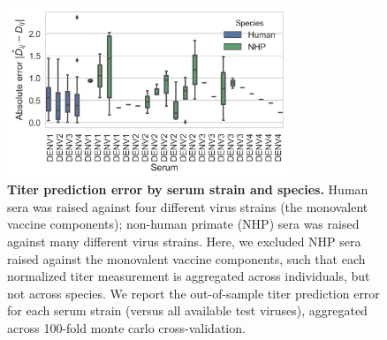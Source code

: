 \documentclass[11pt,oneside,letterpaper]{article}
\begin{document}
\begin{figure}[ht]
\centering
	\includegraphics[width=0.75\textwidth]{../figures/png/titer_species_error.png}
	\caption{\textbf{Titer prediction error by serum strain and species.}
  Human sera was raised against four different virus strains (the monovalent vaccine components); non-human primate (NHP) sera was raised against many different virus strains.
  Here, we excluded NHP sera raised against the monovalent vaccine components, such that each normalized titer measurement is aggregated across individuals, but not across species.
  We report the out-of-sample titer prediction error for each serum strain (versus all available test viruses), aggregated across 100-fold monte carlo cross-validation.
	}
	\label{species_titers}
\end{figure}
\end{document}

